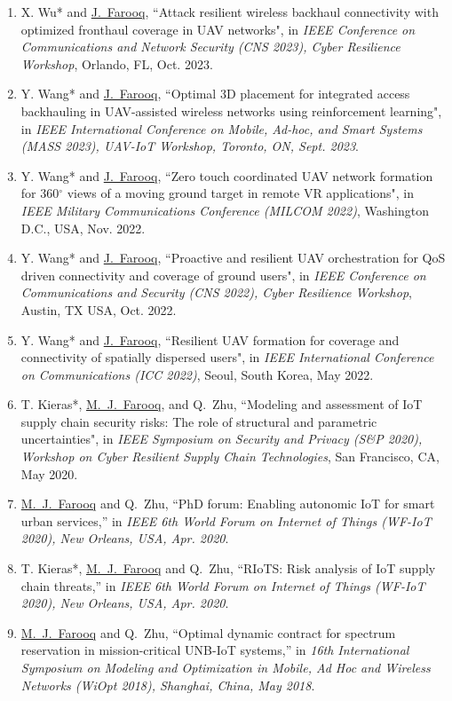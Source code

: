 \documentclass[letterpaper,11pt]{article}
\begin{document}
\begin{enumerate}
       \item[\rm{[C18]}] X. Wu* and \underline{J.~Farooq}, ``Attack resilient wireless backhaul connectivity with optimized fronthaul coverage in UAV networks", in \textit{IEEE Conference on Communications and Network Security (CNS 2023), Cyber Resilience Workshop}, Orlando, FL, Oct. 2023.
      \item[\rm{[C17]}] Y. Wang* and \underline{J.~Farooq}, ``Optimal 3D placement for integrated access backhauling in UAV-assisted wireless networks using reinforcement learning", in \textit{IEEE International Conference on Mobile, Ad-hoc, and Smart Systems (MASS 2023), UAV-IoT Workshop, Toronto, ON, Sept. 2023}.
      \item[\rm{[C16]}] Y. Wang* and \underline{J.~Farooq}, ``Zero touch coordinated UAV network formation for 360$^{\circ}$ views of a moving ground target in remote VR applications", in \textit{IEEE Military Communications Conference (MILCOM 2022)}, Washington D.C., USA, Nov. 2022.
      \item[\rm{[C15]}] Y. Wang* and \underline{J.~Farooq}, ``Proactive and resilient UAV orchestration for QoS driven connectivity and coverage of ground users", in \textit{IEEE Conference on Communications and Security (CNS 2022), Cyber Resilience Workshop}, Austin, TX USA, Oct. 2022.
      \item[\rm{[C14]}] Y. Wang* and \underline{J.~Farooq}, ``Resilient UAV formation for coverage and connectivity of spatially dispersed users", in \textit{IEEE International Conference on Communications (ICC 2022)}, Seoul, South Korea, May 2022.
      \item[\rm{[C13]}] T. Kieras*, \underline{M.~J.~Farooq}, and Q.~Zhu, ``Modeling and assessment of IoT supply chain security risks: The role of structural and parametric uncertainties", in \textit{IEEE Symposium on Security and Privacy (S\&P 2020), Workshop on Cyber Resilient Supply Chain Technologies}, San Francisco, CA, May 2020.
      \item[\rm{[C12]}] \underline{M.~J.~Farooq} and Q.~Zhu, ``PhD forum: Enabling autonomic IoT for smart urban services,'' in \textit{ IEEE 6th World Forum on Internet of Things (WF-IoT 2020), New Orleans, USA, Apr. 2020}.
      \item[\rm{[C11]}] T. Kieras*, \underline{M.~J.~Farooq} and Q.~Zhu, ``RIoTS: Risk analysis of IoT supply chain threats,'' in \textit{ IEEE 6th World Forum on Internet of Things (WF-IoT 2020), New Orleans, USA, Apr. 2020}.
      \item[\rm{[C10]}] \underline{M.~J.~Farooq} and Q.~Zhu, ``Optimal dynamic contract for spectrum reservation in mission-critical UNB-IoT systems,'' in \textit{ 16th International Symposium on Modeling and Optimization in Mobile, Ad Hoc and Wireless Networks (WiOpt 2018), Shanghai, China, May 2018}.

\end{enumerate}
\end{document}
